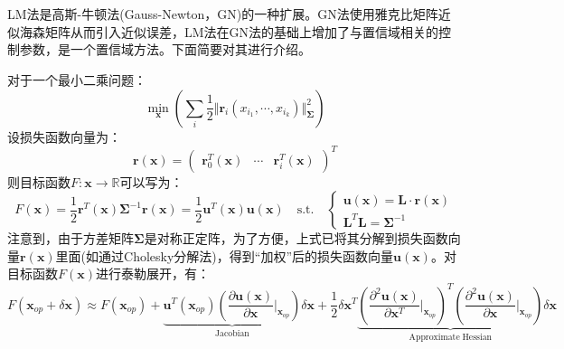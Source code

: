 \chapter{\normf{}}

\section{}
\label{appendix:lm_alg}
LM法是高斯-牛顿法(Gauss-Newton，GN)的一种扩展。GN法使用雅克比矩阵近似海森矩阵从而引入近似误差，LM法在GN法的基础上增加了与置信域相关的控制参数，是一个置信域方法\cite{dellaert2017factor}。下面简要对其进行介绍。

对于一个最小二乘问题：
\begin{equation}
  \min_{\boldsymbol{x}}\left( \sum_{i}\frac{1}{2}\Vert \boldsymbol{r}_i(x_{i_1},\cdots,x_{i_k}) \Vert^2_{\boldsymbol{\Sigma}}\right)
\end{equation}
设损失函数向量为：
\begin{equation}
  \boldsymbol{r(\boldsymbol{x})}=\begin{pmatrix}
    \boldsymbol{r}_0^T(\boldsymbol{x}) &
    \cdots                             &
    \boldsymbol{r}_i^T(\boldsymbol{x})
  \end{pmatrix}^T
\end{equation}
则目标函数$F:\boldsymbol{x}\to\mathbb{R}$可以写为：
\begin{equation}
  F(\boldsymbol{x})=\frac{1}{2}\boldsymbol{r}^T(\boldsymbol{x})\boldsymbol{\Sigma}^{-1}\boldsymbol{r}(\boldsymbol{x})=\frac{1}{2}\boldsymbol{u}^T(\boldsymbol{x})\boldsymbol{u}(\boldsymbol{x})\quad \mathrm{s.t.}\quad\begin{cases}
    \boldsymbol{u}(\boldsymbol{x})=\boldsymbol{L}\cdot\boldsymbol{r}(\boldsymbol{x}) \\
    \boldsymbol{L}^T\boldsymbol{L}=\boldsymbol{\Sigma}^{-1}
  \end{cases}
\end{equation}
注意到，由于方差矩阵$\boldsymbol{\Sigma}$是对称正定阵，为了方便，上式已将其分解到损失函数向量$\boldsymbol{r}(\boldsymbol{x})$里面(如通过Cholesky分解法)，得到“加权”后的损失函数向量$\boldsymbol{u}(\boldsymbol{x})$。对目标函数$F(\boldsymbol{x})$进行泰勒展开，有：
\begin{equation}
  \label{equ:taler}
  F(\boldsymbol{x}_{op}+\delta\boldsymbol{x})\approx F(\boldsymbol{x}_{op})+ \underbrace{ \boldsymbol{u}^T(\boldsymbol{x}_{op})\left(\frac{\partial \boldsymbol{u}(\boldsymbol{x})}{\partial \boldsymbol{x}} \bigg|_{\boldsymbol{x}_{op}}  \right) }_{\mathrm{Jacobian}} \delta\boldsymbol{x}+\frac{1}{2}\delta\boldsymbol{x}^T\underbrace{
    \left( \frac{\partial^2 \boldsymbol{u}(\boldsymbol{x})}{\partial \boldsymbol{x}^T}\bigg|_{\boldsymbol{x}_{op}}\right)^T
    \left( \frac{\partial^2 \boldsymbol{u}(\boldsymbol{x})}{\partial \boldsymbol{x}}\bigg|_{\boldsymbol{x}_{op}}\right)
  }_{\mathrm{Approximate\;Hessian}} \delta\boldsymbol{x}
\end{equation}
